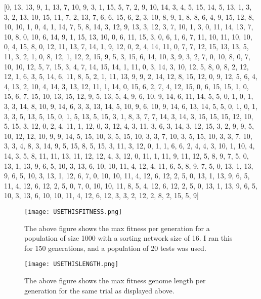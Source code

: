 \documentclass[9pt]{article}
\begin{document}
[0, 13, 13, 9, 1, 13, 7, 10, 9, 3, 1, 15, 5, 7, 2, 9, 10, 14, 3, 4, 5, 15, 14, 5, 13, 1, 3, 3, 2, 13, 10, 15, 11, 7, 2, 13, 7, 6, 6, 15, 6, 2, 3, 10, 8, 9, 1, 8, 8, 6, 4, 9, 15, 12, 8, 10, 10, 1, 0, 4, 1, 14, 7, 5, 8, 14, 3, 12, 9, 13, 3, 12, 3, 7, 10, 1, 3, 0, 11, 14, 13, 7, 10, 8, 0, 10, 6, 14, 9, 1, 15, 13, 10, 0, 6, 11, 15, 3, 0, 6, 1, 6, 7, 11, 10, 11, 10, 10, 0, 4, 15, 8, 0, 12, 11, 13, 7, 14, 1, 9, 12, 0, 2, 4, 14, 11, 0, 7, 7, 12, 15, 13, 13, 5, 11, 3, 2, 1, 0, 8, 12, 1, 12, 2, 15, 9, 5, 3, 15, 6, 14, 10, 3, 9, 3, 2, 7, 0, 10, 8, 0, 7, 10, 10, 12, 5, 7, 15, 3, 4, 7, 14, 15, 14, 1, 11, 0, 3, 14, 3, 10, 12, 5, 8, 0, 8, 2, 12, 12, 1, 6, 3, 5, 14, 6, 11, 8, 5, 2, 1, 11, 13, 9, 9, 2, 14, 12, 8, 15, 12, 0, 9, 12, 5, 6, 4, 4, 13, 2, 10, 4, 14, 3, 13, 12, 11, 1, 14, 0, 15, 6, 2, 7, 4, 12, 15, 0, 6, 15, 15, 1, 0, 15, 6, 7, 15, 10, 13, 15, 12, 9, 5, 13, 5, 4, 9, 6, 10, 9, 14, 6, 11, 14, 5, 5, 0, 1, 0, 1, 3, 3, 14, 8, 10, 9, 14, 6, 3, 3, 13, 14, 5, 10, 9, 6, 10, 9, 14, 6, 13, 14, 5, 5, 0, 1, 0, 1, 3, 3, 5, 13, 5, 15, 0, 1, 5, 13, 5, 15, 3, 1, 8, 3, 7, 7, 14, 3, 14, 3, 15, 15, 15, 12, 10, 5, 15, 3, 12, 0, 2, 4, 11, 1, 12, 0, 3, 12, 4, 3, 11, 3, 6, 3, 14, 3, 12, 15, 3, 2, 9, 9, 5, 10, 12, 12, 10, 9, 9, 14, 5, 15, 10, 3, 5, 15, 10, 3, 3, 7, 10, 3, 5, 15, 10, 3, 3, 7, 10, 3, 3, 4, 8, 3, 14, 9, 5, 15, 8, 5, 15, 3, 11, 3, 12, 0, 1, 1, 6, 6, 2, 4, 4, 3, 10, 1, 10, 4, 14, 3, 5, 8, 11, 11, 13, 11, 12, 12, 4, 3, 12, 0, 11, 1, 11, 9, 11, 12, 5, 8, 9, 7, 5, 0, 13, 1, 13, 9, 6, 5, 10, 3, 13, 6, 10, 10, 11, 4, 12, 4, 11, 6, 5, 8, 9, 7, 5, 0, 13, 1, 13, 9, 6, 5, 10, 3, 13, 1, 12, 6, 7, 0, 10, 10, 11, 4, 12, 6, 12, 2, 5, 0, 13, 1, 13, 9, 6, 5, 11, 4, 12, 6, 12, 2, 5, 0, 7, 0, 10, 10, 11, 8, 5, 4, 12, 6, 12, 2, 5, 0, 13, 1, 13, 9, 6, 5, 10, 3, 13, 6, 10, 10, 11, 4, 12, 6, 12, 3, 3, 2, 12, 2, 8, 2, 15, 5, 9]


\begin{figure}[H]
\texttt{[image: USETHISFITNESS.png]}
  \caption{The above figure shows the max fitness per generation for a population of size 1000 with a sorting network size of 16. I ran this for 150 generations, and a population of 20 tests was used. }
  \end{figure}
  
  \begin{figure}[H]
\texttt{[image: USETHISLENGTH.png]}
  \caption{The above figure shows the max fitness genome length per generation for the same trial as displayed above. }
  
 
  \end{figure}
\end{document}
